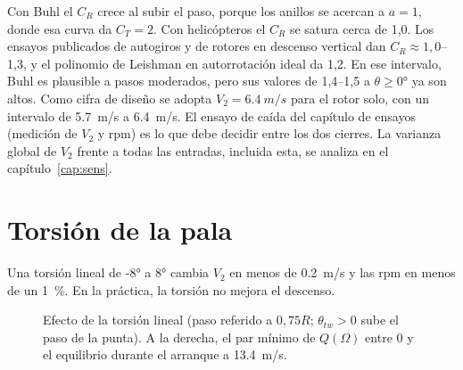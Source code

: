 Con Buhl el $C_R$ crece al subir el paso, porque los anillos se acercan a $a=1$, donde
esa curva da $C_T=2$. Con helicópteros el $C_R$ se satura cerca de 1,0. Los ensayos
publicados de autogiros y de rotores en descenso vertical dan $C_R\approx1{,}0$--1,3, y
el polinomio de Leishman en autorrotación ideal da 1,2. En ese intervalo, Buhl es
plausible a pasos moderados, pero sus valores de 1,4--1,5 a $\theta\ge\ang{0}$ ya son
altos. Como cifra de diseño se adopta $V_2=\SI{6.4}{m/s}$ para el rotor solo, con un
intervalo de \SI{5.7}{m/s} a \SI{6.4}{m/s}. El ensayo de caída del capítulo de ensayos
(medición de $V_2$ y rpm) es lo que debe decidir entre los dos cierres. La
varianza global de $V_2$ frente a todas las entradas, incluida esta, se analiza en el
capítulo~\ref{cap:sens}.

\section{Torsión de la pala}\label{sec:bemt-torsion}

Una torsión lineal de \ang{-8} a \ang{+8} cambia $V_2$ en menos de \SI{0.2}{m/s} y las
rpm en menos de un \SI{1}{\percent}. En la práctica, la torsión no mejora el descenso.

\begin{figure}[H]
\centering
{}
\caption{Efecto de la torsión lineal (paso referido a $0{,}75R$; $\theta_{tw}>0$ sube el
paso de la punta). A la derecha, el par mínimo de $Q(\Omega)$ entre 0 y el equilibrio
durante el arranque a \SI{13.4}{m/s}.}
\label{fig:bemt-torsion}
\end{figure}

